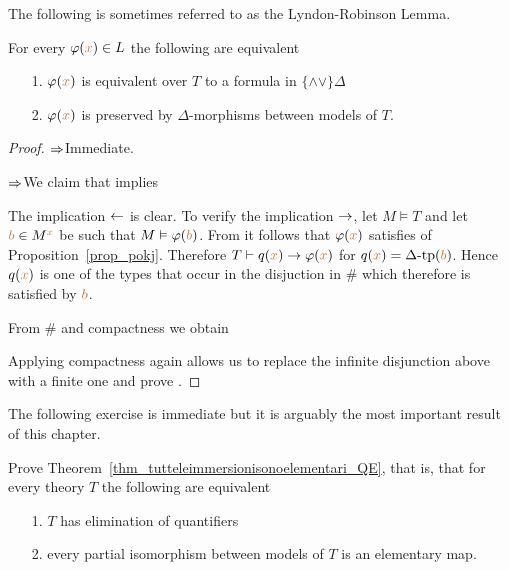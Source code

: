 The following is sometimes referred to as the Lyndon-Robinson Lemma.

\begin{lemma}\label{lem_qfdefinability}
For every $\varphi({\color{brown} x})\in L$ the following are equivalent
\begin{itemize}
\item[1.] $\varphi({\color{brown} x})$ is equivalent over $T$ to a formula in $\{\mathord\wedge\mathord\vee\}\Delta$
\item[2.] $\varphi({\color{brown} x})$ is preserved by $\Delta$-morphisms between models of $T$.
\end{itemize}
\end{lemma}
\begin{proof} $\Rightarrow$\quad Immediate.

$\Rightarrow$\quad  We claim that  implies


The implication $\leftarrow$ is clear.
To verify the implication $\rightarrow$, let $M\models T$ and let ${\color{brown} b}\in M^{\color{brown} x}$ be such that $M\vDash\varphi({\color{brown} b})$.
From  it follows that $\varphi({\color{brown} x})$ satisfies  of Proposition~\ref{prop_pokj}.
Therefore $T\vdash q({\color{brown} x})\rightarrow\varphi({\color{brown} x})$ for $q({\color{brown} x})=\Delta\mbox{\rm -tp}({\color{brown} b})$.
Hence $q({\color{brown} x})$ is one of the types that occur in the disjuction in $\#$ which therefore is satisfied by ${\color{brown} b}$.

From $\#$ and compactness we obtain


Applying compactness again allows us to replace the infinite disjunction above with a finite one and prove .
\end{proof}

The following exercise is immediate but it is arguably the most important result of this chapter. 

\begin{exercise}\label{ex_prove_thm_EQ}
Prove Theorem~\ref{thm_tutteleimmersionisonoelementari_QE}, that is, that for every theory $T$ the following are equivalent
\begin{itemize}
\item[1.] $T$ has elimination of quantifiers
\item[2.] every partial isomorphism between models of $T$ is an elementary map.\QED
\end{itemize}
\end{exercise}

